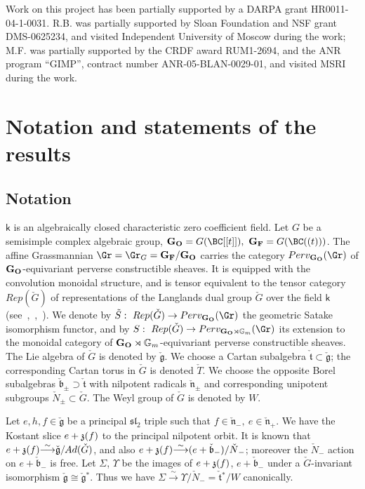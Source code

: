 \documentclass[11pt]{amsart}
\theoremstyle{definition}
\theoremstyle{remark}
\theoremstyle{remark}
\newcommand{\iso}{{\stackrel{\sim}{\longrightarrow}}}
\newcommand{\<}{\langle}
\renewcommand{\>}{\rangle}
\newcommand{\z}{{\frak z}}
\newcommand{\Lg}{\check{\mathfrak g}{}}
\newcommand{\Ln}{\check{\mathfrak n}{}}
\newcommand{\Lt}{\check{\mathfrak t}{}}
\newcommand{\Lb}{\check{\mathfrak b}{}}
\newcommand{\LN}{\check{N}{}}
\newcommand{\LG}{{\check{G}}}
\newcommand{\LT}{\check{T}{}}
\newcommand{\GO}{{\bf G_O}}
\newcommand{\GK}{{\bf G_F}}
\newcommand{\Gm}{{{\mathbb G}_m}}
\newcommand{\kk}{\mathsf k}
\begin{document}
Work on this project has been partially supported by a
DARPA grant HR0011-04-1-0031.
 R.B. was partially supported by Sloan Foundation and NSF grant 
DMS-0625234,
and visited Independent University of Moscow during the work;
M.F. was partially supported by the CRDF award RUM1-2694, and
the ANR program ``GIMP'', contract number ANR-05-BLAN-0029-01,
and visited MSRI during the work.








\section{Notation and statements of the results}


\subsection{Notation}

$\kk$ is an algebraically closed characteristic zero coefficient
field. Let $G$ be a semisimple complex algebraic group, 
$\GO=G(\BC[[t]]),\ \GK=G(\BC((t)))$. 
The affine Grassmannian $\Gr=\Gr_G=\GK/\GO$
carries the category $Perv_\GO(\Gr)$ of $\GO$-equivariant perverse 
constructible sheaves. It is equipped with the convolution monoidal 
structure, and is tensor equivalent to the tensor category $Rep(\LG)$ of 
representations of the Langlands dual group $\LG$ over the field $\kk$
(see~\cite{L},~\cite{BD},~\cite{G}). We denote by $\tilde{S}:\ 
Rep(\LG)\to Perv_\GO(\Gr)$ the geometric Satake isomorphism functor,
and by $S:\ Rep(\LG)\to Perv_{\GO\rtimes\Gm}(\Gr)$ its extension 
to the monoidal category of $\GO\rtimes\Gm$-equivariant perverse
constructible sheaves.
The Lie algebra of $\LG$ is denoted by $\Lg$. We choose a Cartan subalgebra
$\Lt\subset\Lg$; the corresponding Cartan torus in $\LG$ is denoted $\LT$.
We choose the opposite Borel subalgebras $\Lb_\pm\supset\Lt$ with 
nilpotent radicals $\Ln_\pm$ and corresponding unipotent subgroups 
$\LN_\pm\subset\LG$. The Weyl group of $\LG$ is denoted by $W$.

Let $e,h,f\in \Lg$ be a principal ${\mathfrak{sl}}_2$ triple
such that $f\in\Ln_-,\ e\in\Ln_+$. We have the
Kostant slice $e+\z(f)$ to the
principal nilpotent orbit. It is known that $e+\z(f)\iso \Lg/Ad (\LG)$,
and also $e+\z(f)\iso (e+\Lb_-)/\LN_-$; moreover the $\LN_-$ action on
$e+\Lb_-$ is free. 
Let $\Sigma$, $\Upsilon$ be the images of $e+\z(f)$, $e+\Lb_-$
under a $\LG$-invariant isomorphism $\Lg\cong \Lg^*$. Thus we have
$\Sigma\iso \Upsilon/\LN_-=\Lt^*/W$ canonically.
\end{document}
